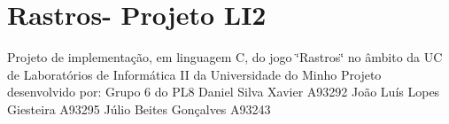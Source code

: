 \section*{Rastros-\/ Projeto L\+I2}

Projeto de implementação, em linguagem C, do jogo \char`\"{}\+Rastros\char`\"{} no âmbito da UC de Laboratórios de Informática II da Universidade do Minho  Projeto desenvolvido por\+:  Grupo 6 do P\+L8  Daniel Silva Xavier A93292  João Luís Lopes Giesteira A93295  Júlio Beites Gonçalves A93243 